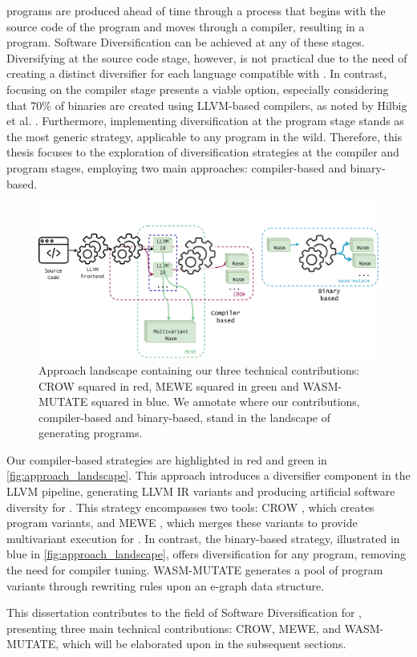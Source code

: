 


\Wasm programs are produced ahead of time through a process that begins with the source code of the program and moves through a compiler, resulting in a \Wasm program. 
Software Diversification can be achieved at any of these stages. 
Diversifying at the source code stage, however, is not practical due to the need of creating a distinct diversifier for each language compatible with \Wasm. 
In contrast, focusing on the compiler stage presents a viable option, especially considering that 70\% of \Wasm binaries are created using LLVM-based compilers, as noted by Hilbig et al. \cite{Hilbig2021AnES}. 
Furthermore, implementing diversification at the \Wasm program stage stands as the most generic strategy, applicable to any \Wasm program in the wild. 
Therefore, this thesis focuses to the exploration of diversification strategies at the compiler and \Wasm program stages, employing two main approaches: compiler-based and binary-based.


\begin{figure}[h]
	\centering
	\includegraphics[width=1.0\textwidth]{figures/landscape.pdf}
	\caption{Approach landscape containing our three technical contributions: CROW squared in red, MEWE squared in green and WASM-MUTATE squared in blue. We annotate where our contributions, compiler-based and binary-based, stand in the landscape of generating \Wasm programs.}
	\label{fig:approach_landscape}
\end{figure}

Our compiler-based strategies are highlighted in red and green in \autoref{fig:approach_landscape}. 
This approach introduces a diversifier component in the LLVM pipeline, generating LLVM IR variants and producing artificial software diversity for \wasm. 
This strategy encompasses two tools: CROW \cite{CROW}, which creates \wasm program variants, and MEWE \cite{MEWE}, which merges these variants to provide multivariant execution for \wasm.
In contrast, the binary-based strategy, illustrated in blue in \autoref{fig:approach_landscape}, offers diversification for any \Wasm program, removing the need for compiler tuning. 
WASM-MUTATE \cite{wasmmutate} generates a pool of \Wasm program variants through rewriting rules upon an e-graph \cite{e-graph} data structure.


This dissertation contributes to the field of Software Diversification for \Wasm, presenting three main technical contributions: CROW, MEWE, and WASM-MUTATE, which will be elaborated upon in the subsequent sections.

